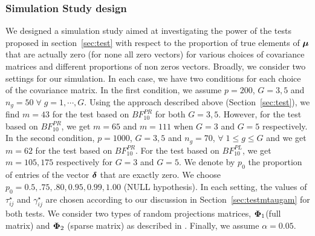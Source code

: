 \documentclass[times,sort&compress,3p]{elsarticle}
\theoremstyle{plain}%
\theoremstyle{definition}
\newcommand{\udelta}            {\mbox{\boldmath$\delta$}}
\newcommand{\umu}               {\mbox{\boldmath$\mu$}}
\newcommand{\uPhi}              {\mbox{\boldmath$\Phi$}}
\begin{document}
\subsubsection{Simulation Study design}
We designed a simulation study aimed at investigating the power of the tests proposed in section~\ref{sec:test}
with respect to the proportion of true elements of $\umu$ that are actually zero (for none all zero vectors) for various choices of covariance matrices and different proportions of non zeros vectors.
Broadly, we consider two settings for our simulation. In each case, we have two conditions for each choice of the covariance matrix. 
In the first condition, we assume $p = 200$, $G=3, 5$ and $n_g = 50\;\forall\; g =  1, \cdots, G$. Using the approach described above (Section~\ref{sec:test}), we find $m = 43$ for the test based on $BF^{PR}_{10}$ for both $G=3,5$. However, for the test based on $BF_{10}^{PR}$, we get $m = 65$ and $m = 111$ when $G=3$ and $G=5$ respectively. 
In the second condition, $p = 1000$, $G=3, 5$ and $n_g = 70$, $\forall\; 1 \leq g \leq G$ and we get $m = 62$ for the test based on $BF^{PR}_{10}$. For the test based on $BF^{PL}_{10}$, we get $m = 105, 175$ respectively for $G=3$ and $G=5$. We denote by $p_0$ the proportion of entries of the vector $\udelta$ that are exactly zero. We choose $p_0 = 0.5, .75, .80, 0.95, 0.99, 1.00$ (NULL hypothesis).
In each setting, the values of $\tau^{\star}_{ij}$ and $\gamma^{\star}_{ij}$ are chosen according to our discussion in Section~\ref{sec:testmtaugam} for both tests. We consider two types of random projections matrices, $\uPhi_{1}$(full matrix)  and $\uPhi_2$ (sparse matrix) as described in \citealp{srivastava2014raptt,zoh2018powerful}. Finally, we assume $\alpha = 0.05$.
\end{document}
